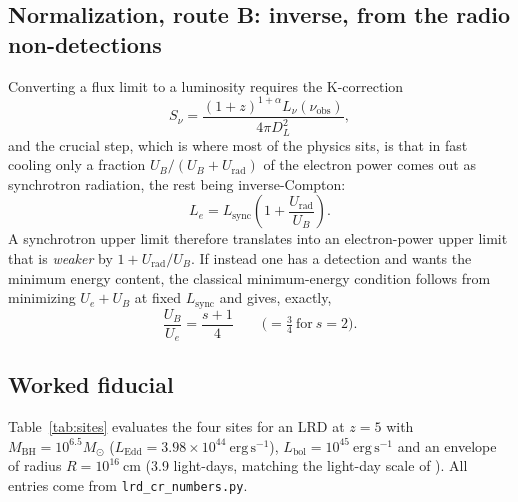 \documentclass[11pt,a4paper]{article}
\newcommand{\ergs}{\ \mathrm{erg\,s^{-1}}}
\begin{document}
\subsection{Normalization, route B: inverse, from the radio non-detections}
\label{sec:normB}
Converting a flux limit to a luminosity requires the K-correction
\begin{equation}
  S_\nu=\frac{(1+z)^{1+\alpha}L_\nu(\nu_{\mathrm{obs}})}{4\pi D_L^{2}},
  \label{eq:kcorr}
\end{equation}
and the crucial step, which is where most of the physics sits, is that in fast
cooling only a fraction $U_B/(U_B+U_{\mathrm{rad}})$ of the electron power comes
out as synchrotron radiation, the rest being inverse-Compton:
\begin{equation}
  L_e = L_{\mathrm{sync}}\left(1+\frac{U_{\mathrm{rad}}}{U_B}\right).
  \label{eq:deboost}
\end{equation}
A synchrotron upper limit therefore translates into an electron-power upper
limit that is \emph{weaker} by $1+U_{\mathrm{rad}}/U_B$. If instead one has a
detection and wants the minimum energy content, the classical minimum-energy
condition follows from minimizing $U_e+U_B$ at fixed $L_{\mathrm{sync}}$ and
gives, exactly,
\begin{equation}
  \frac{U_B}{U_e}=\frac{s+1}{4}
  \qquad\bigl(=\tfrac34\ \text{for}\ s=2\bigr).
  \label{eq:equip}
\end{equation}

\subsection{Worked fiducial}
\label{sec:fid}
Table~\ref{tab:sites} evaluates the four sites for an LRD at $z=5$ with
$M_{\mathrm{BH}}=10^{6.5}M_\odot$ ($L_{\mathrm{Edd}}=3.98\times10^{44}\ergs$),
$L_{\mathrm{bol}}=10^{45}\ergs$ and an envelope of radius
$R=10^{16}\ \mathrm{cm}$ (3.9 light-days, matching the light-day scale of
\citealt{Rusakov2026}). All entries come from \texttt{lrd\_cr\_numbers.py}.
\end{document}
